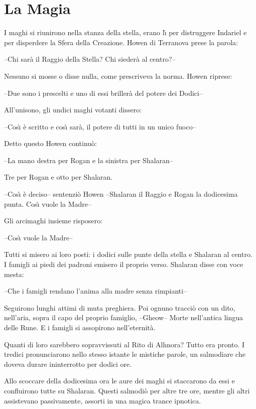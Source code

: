 \iffullversion
\onecolumn
\fi
\chapter{La Magia}
\label{magia}

\iffullversion
\vfill
\begin{racconto}
  
  I maghi si riunirono nella stanza della stella, erano l\`{\i} per
  distruggere Indariel e per disperdere la Sfera della Creazione.
  Howen di Terranova prese la parola:
  
  --Chi sar\`a il Raggio della Stella? Chi sieder\`a al centro?--
  
  Nessuno si mosse o disse nulla, come prescriveva la norma. Howen
  riprese:

  --Due sono i prescelti e uno di essi briller\`a del potere dei Dodici--
  
  All'unisono, gli undici maghi votanti dissero:
  
  --Cos\`{\i} \`e scritto e cos\`{\i} sar\`a, il potere di tutti in un unico
  fuoco--
  
  Detto questo Howen continu\`o:

  --La mano destra per Rogan e la sinistra per Shalaran--
  
  Tre per Rogan e otto per Shalaran.
  
  --Cos\`{\i} \`e deciso-- sentenzi\`o Howen --Shalaran il Raggio e
  Rogan la dodicesima punta. Cos\`{\i} vuole la Madre--
  
  Gli arcimaghi insieme risposero:
  
  --Cos\`{\i} vuole la Madre--
  
  Tutti si misero ai loro posti: i dodici sulle punte della stella e
  Shalaran al centro. I famigli ai piedi dei padroni emisero il
  proprio verso. Shalaran disse con voce mesta:
  
  --Che i famigli rendano l'anima alla madre senza rimpianti--
  
  Seguirono lunghi attimi di muta preghiera. Poi ognuno tracci\`o
  con un dito, nell'aria, sopra il capo del proprio famiglio, --Gheow--
  Morte nell'antica lingua delle Rune. E i famigli si assopirono
  nell'eternit\`a.
  
  Quanti di loro sarebbero sopravvissuti al Rito di Alhnora? Tutto era
  pronto.  I tredici pronunciarono nello stesso istante le mistiche
  parole, un salmodiare che doveva durare ininterrotto per dodici ore.
  
  Allo scoccare della dodicesima ora le aure dei maghi si staccarono
  da essi e confluirono tutte su Shalaran.  Questi salmodi\`o per
  altre tre ore, mentre gli altri assistevano passivamente, assorti in
  una magica trance ipnotica.
  

\end{racconto}
